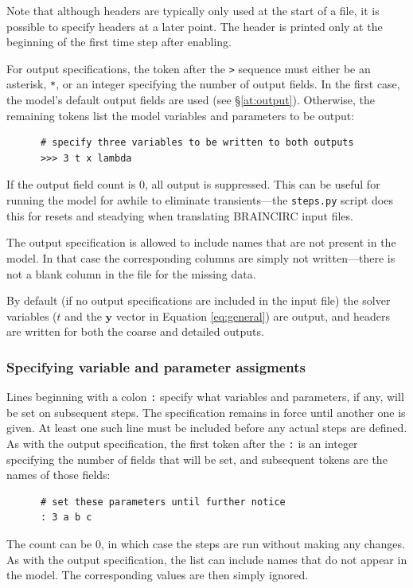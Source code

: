 \documentclass[a4paper,11pt]{article}
\newcommand{\vv}[1]{\mathbf{#1}}
\begin{document}
Note that although headers are typically only used at the start of a file, it is possible to specify headers at a later point. The header is printed only at the beginning of the first time step after enabling.

For output specifications, the token after the \texttt{>} sequence must either be an asterisk, \texttt{*}, or an integer specifying the number of output fields. In the first case, the model's default output fields are used (see \S\ref{at:output}). Otherwise, the remaining tokens list the model variables and parameters to be output:
\begin{verbatim}
      # specify three variables to be written to both outputs
      >>> 3 t x lambda
\end{verbatim}
If the output field count is 0, all output is suppressed. This can be useful for running the model for awhile to eliminate transients---the \texttt{steps.py} script does this for resets and steadying when translating BRAINCIRC input files.

The output specification is allowed to include names that are not present in the model. In that case the corresponding columns are simply not written---there is not a blank column in the file for the missing data.

By default (if no output specifications are included in the input file) the solver variables ($t$ and the $\vv{y}$ vector in Equation \ref{eq:general}) are output, and headers are written for both the coarse and detailed outputs.

\subsubsection{Specifying variable and parameter assigments}
Lines beginning with a colon \texttt{:} specify what variables and parameters, if any, will be set on subsequent steps. The specification remains in force until another one is given. At least one such line must be included before any actual steps are defined. As with the output specification, the first token after the \texttt{:} is an integer specifying the number of fields that will be set, and subsequent tokens are the names of those fields:
\begin{verbatim}
      # set these parameters until further notice
      : 3 a b c
\end{verbatim}
The count can be 0, in which case the steps are run without making any changes. As with the output specification, the list can include names that do not appear in the model. The corresponding values are then simply ignored.
\end{document}
